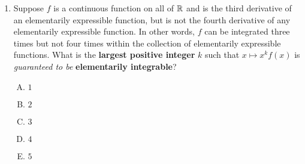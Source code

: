 \documentclass[10pt]{amsart}
\begin{document}
\begin{enumerate}
  \begin{enumerate}[(A)]
  \item We choose $\exp$ as the part to integrate and $\sin$ as the
    part to differentiate, and apply this process once to get the
    answer directly.
  \item We choose $\exp$ as the part to integrate and $\sin$ as the
    part to differentiate, and apply this process once, then use a
    {\em recursive} method (identify the integrals on the left and
    right side) to get the answer.
  \item We choose $\exp$ as the part to integrate and $\sin$ as the
    part to differentiate, and apply this process twice to get the
    answer directly.
  \item We choose $\exp$ as the part to integrate and $\sin$ as the
    part to differentiate, and apply this process twice, then use a
    {\em recursive} method (identify the integrals on the left and
    right side) to get the answer.
  \item We choose $\exp$ as the part to integrate and $\sin$ as the
    part to differentiate, and we apply integration by parts four
    times to get the answer directly.
  \end{enumerate}

  {\em Answer}: Option (D)

  {\em Explanation}: $\sin$ is the negative of its second derivative,
  $\exp$ equals its second antiderivative.

  {\em Performance review}: $22$ out of $25$ people got this. $3$ chose (C).

  {\em Historical note (Math 153)}: $38$ out of $41$ got this. $3$
  chose (C).


\item Suppose $f$ is a continuous function on all of $\mathbb{R}$ and is the
  third derivative of an elementarily expressible function, but is not
  the fourth derivative of any elementarily expressible function. In
  other words, $f$ can be integrated three times but not four times
  within the collection of elementarily expressible functions. What is
  the {\bf largest positive integer} $k$ such that $x \mapsto x^kf(x)$
  is {\em guaranteed to be} {\bf elementarily integrable}?

  \begin{enumerate}[(A)]
  \item $1$
  \item $2$
  \item $3$
  \item $4$
  \item $5$
  \end{enumerate}


\end{enumerate}
\end{document}
